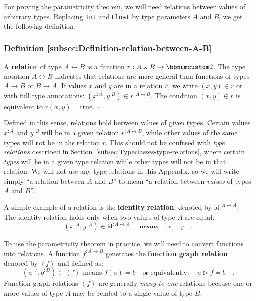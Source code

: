 For proving the parametricity theorem, we will need relations between
values of arbitrary types. Replacing \lstinline!Int! and \lstinline!Float!
by type parameters $A$ and $B$, we get the following definition:

\subsubsection{Definition \label{subsec:Definition-relation-between-A-B}\ref{subsec:Definition-relation-between-A-B}}

A \textbf{relation} of
type $A\leftrightarrow B$ is a function $r:A\times B\rightarrow\bbnum 2$.
The type notation $A\leftrightarrow B$ indicates that relations are
more general than functions of types $A\rightarrow B$ or $B\rightarrow A$.
If values $x$ and $y$ are in a relation $r$, we write $(x,y)\in r$
or with full type annotations: $(x^{:A},y^{:B})\in r^{:A\leftrightarrow B}$.
The condition $(x,y)\in r$ is equivalent to $r(x,y)=\text{true}$.
$\square$

Defined in this sense, relations hold between values of given types.
Certain values $x^{:A}$ and $y^{:B}$ will be in a given relation
$r^{:A\leftrightarrow B}$, while other values of the same types will
not be in the relation $r$. This should not be confused with \emph{type
relations} described in Section~\ref{subsec:Typeclasses-type-relations},
where certain \emph{types} will be in a given type relation while
other types will not be in that relation. We will not use any type
relations in this Appendix, so we will write simply \textsf{``}a relation
between $A$ and $B$\textsf{''} to mean \textsf{``}a relation between \emph{values}
of types $A$ and $B$\textsf{''}.

A simple example of a relation is the \textbf{identity relation},
denoted by $\text{id}^{:A\leftrightarrow A}$. The identity relation
holds only when two values of type $A$ are equal:
\[
(x^{:A},y^{:A})\in\text{id}^{:A\leftrightarrow A}\quad\text{ means }\quad x=y\quad.
\]

To use the parametricity theorem in practice, we will need to convert
functions into relations. A function $f^{:A\rightarrow B}$ generates
the \textbf{function graph} \textbf{relation}
denoted by $\left<f\right>$ and defined as:
\[
(a^{:A},b^{:B})\in\left<f\right>\text{ means }f(a)=b\quad\text{or equivalently}:\quad a\triangleright f=b\quad.
\]
Function graph relations $\left<f\right>$ are generally \emph{many-to-one}
relations because one or more values of type $A$ may be related to
a single value of type $B$.

